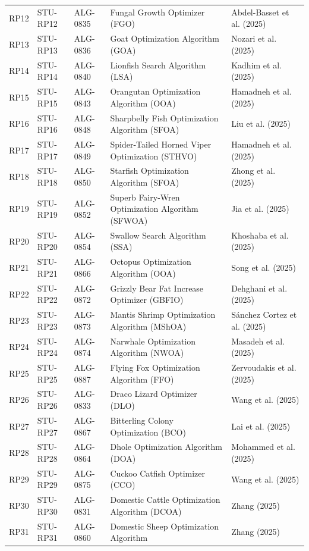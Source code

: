 \documentclass[9pt]{article}
\begin{document}
\begin{landscape}
\begin{longtable}{P{1.1cm}P{1.8cm}P{1.8cm}P{9.5cm}P{6.0cm}}
RP12 & STU-RP12 & ALG-0835 & Fungal Growth Optimizer (FGO) & Abdel-Basset et al. (2025) \\
RP13 & STU-RP13 & ALG-0836 & Goat Optimization Algorithm (GOA) & Nozari et al. (2025) \\
RP14 & STU-RP14 & ALG-0840 & Lionfish Search Algorithm (LSA) & Kadhim et al. (2025) \\
RP15 & STU-RP15 & ALG-0843 & Orangutan Optimization Algorithm (OOA) & Hamadneh et al. (2025) \\
RP16 & STU-RP16 & ALG-0848 & Sharpbelly Fish Optimization Algorithm (SFOA) & Liu et al. (2025) \\
RP17 & STU-RP17 & ALG-0849 & Spider-Tailed Horned Viper Optimization (STHVO) & Hamadneh et al. (2025) \\
RP18 & STU-RP18 & ALG-0850 & Starfish Optimization Algorithm (SFOA) & Zhong et al. (2025) \\
RP19 & STU-RP19 & ALG-0852 & Superb Fairy-Wren Optimization Algorithm (SFWOA) & Jia et al. (2025) \\
RP20 & STU-RP20 & ALG-0854 & Swallow Search Algorithm (SSA) & Khoshaba et al. (2025) \\
RP21 & STU-RP21 & ALG-0866 & Octopus Optimization Algorithm (OOA) & Song et al. (2025) \\
RP22 & STU-RP22 & ALG-0872 & Grizzly Bear Fat Increase Optimizer (GBFIO) & Dehghani et al. (2025) \\
RP23 & STU-RP23 & ALG-0873 & Mantis Shrimp Optimization Algorithm (MShOA) & Sánchez Cortez et al. (2025) \\
RP24 & STU-RP24 & ALG-0874 & Narwhale Optimization Algorithm (NWOA) & Masadeh et al. (2025) \\
RP25 & STU-RP25 & ALG-0887 & Flying Fox Optimization Algorithm (FFO) & Zervoudakis et al. (2025) \\
RP26 & STU-RP26 & ALG-0833 & Draco Lizard Optimizer (DLO) & Wang et al. (2025) \\
RP27 & STU-RP27 & ALG-0867 & Bitterling Colony Optimization (BCO) & Lai et al. (2025) \\
RP28 & STU-RP28 & ALG-0864 & Dhole Optimization Algorithm (DOA) & Mohammed et al. (2025) \\
RP29 & STU-RP29 & ALG-0875 & Cuckoo Catfish Optimizer (CCO) & Wang et al. (2025) \\
RP30 & STU-RP30 & ALG-0831 & Domestic Cattle Optimization Algorithm (DCOA) & Zhang (2025) \\
RP31 & STU-RP31 & ALG-0860 & Domestic Sheep Optimization Algorithm & Zhang (2025) \\

\end{longtable}
\end{landscape}
\end{document}
